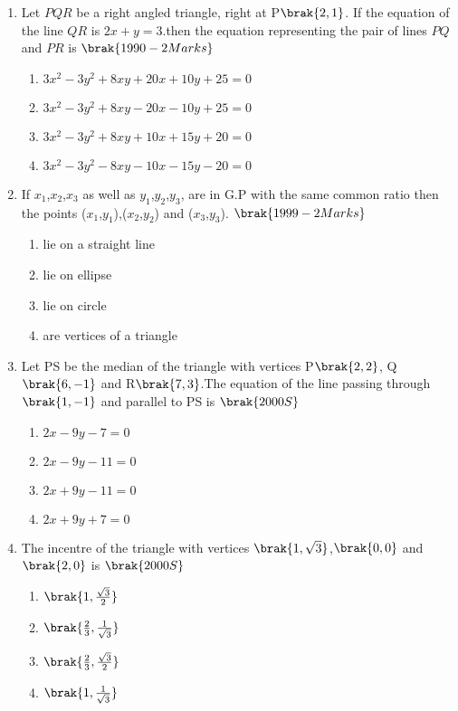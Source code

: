 \begin{enumerate}
\begin{enumerate}
\end{enumerate}
\item Let $PQR$ be a right angled triangle, right at P$\brak{2,1}$. If the equation of the line $QR$ is $2x+y=3$.then the equation representing the pair of lines $PQ$ and $PR$ is
\hfill{$\brak{1990-2 Marks}$}
\begin{enumerate}
    \item $3x^2-3y^2+8xy+20x+10y+25=0$
    \item $3x^2-3y^2+8xy-20x-10y+25=0$
    \item $3x^2-3y^2+8xy+10x+15y+20=0$
    \item $3x^2-3y^2-8xy-10x-15y-20=0$
\end{enumerate}
\item If $x_1$,$x_2$,$x_3$ as well as $y_1$,$y_2$,$y_3$, are in G.P with the same common ratio then the points ($x_1$,$y_1$),($x_2$,$y_2$) and ($x_3$,$y_3$).
\hfill{$\brak{1999-2 Marks}$}
\begin{enumerate}
    
        \item lie on a straight line
        \item lie on ellipse
        \item lie on circle
        \item are vertices of a triangle 
    
\end{enumerate}
\item Let PS be the median of the triangle with vertices P$\brak{2,2}$, Q$\brak{6,-1}$ and R$\brak{7,3}$.The equation of the line passing through $\brak{1,-1}$ and parallel to PS is 
\hfill{$\brak{2000S}$}
\begin{enumerate}

      \item $2x-9y-7=0$  
      \item $2x-9y-11=0$
      \item $2x+9y-11=0$
      \item $2x+9y+7=0$

\end{enumerate}
\item The incentre of the triangle with vertices $\brak{1,\sqrt{3}}$,$\brak{0,0}$ and $\brak{2,0}$ is 
\hfill{$\brak{2000S}$}
\begin{enumerate}
    
     \item $\brak{1,\frac{\sqrt{3}}{2}}$
     \item $\brak{\frac{2}{3},\frac{1}{\sqrt{3}}}$
     \item $\brak{\frac{2}{3},\frac{\sqrt{3}}{2}}$
     \item $\brak{1,\frac{1}{\sqrt{3}}}$
    

\end{enumerate}
\end{enumerate}
